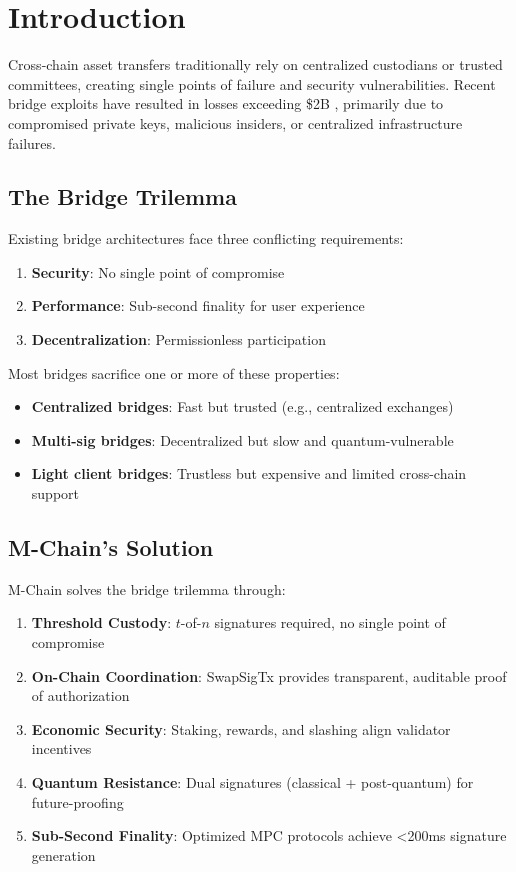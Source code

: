 \section{Introduction}


Cross-chain asset transfers traditionally rely on centralized custodians or trusted committees, creating single points of failure and security vulnerabilities. Recent bridge exploits have resulted in losses exceeding \$2B \cite{bridge-exploits-2022}, primarily due to compromised private keys, malicious insiders, or centralized infrastructure failures.

\subsection{The Bridge Trilemma}

Existing bridge architectures face three conflicting requirements:

\begin{enumerate}
\item \textbf{Security}: No single point of compromise
\item \textbf{Performance}: Sub-second finality for user experience
\item \textbf{Decentralization}: Permissionless participation
\end{enumerate}

Most bridges sacrifice one or more of these properties:
\begin{itemize}
\item \textbf{Centralized bridges}: Fast but trusted (e.g., centralized exchanges)
\item \textbf{Multi-sig bridges}: Decentralized but slow and quantum-vulnerable
\item \textbf{Light client bridges}: Trustless but expensive and limited cross-chain support
\end{itemize}

\subsection{M-Chain's Solution}

M-Chain solves the bridge trilemma through:

\begin{enumerate}
\item \textbf{Threshold Custody}: $t$-of-$n$ signatures required, no single point of compromise
\item \textbf{On-Chain Coordination}: SwapSigTx provides transparent, auditable proof of authorization
\item \textbf{Economic Security}: Staking, rewards, and slashing align validator incentives
\item \textbf{Quantum Resistance}: Dual signatures (classical + post-quantum) for future-proofing
\item \textbf{Sub-Second Finality}: Optimized MPC protocols achieve <200ms signature generation
\end{enumerate}

